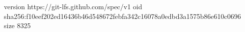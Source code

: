 version https://git-lfs.github.com/spec/v1
oid sha256:f10eef202ed16436b46d548672febfa342c16078a0edbd3a1575b86e610c0696
size 8325
